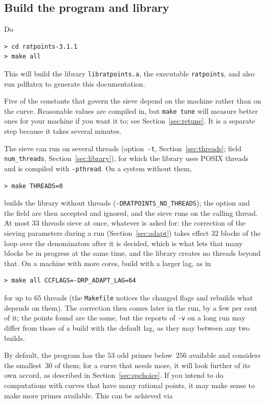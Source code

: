 \documentclass[12pt,a4paper,oneside]{amsart}
\begin{document}
\subsection{Build the program and library}\label{sec:build}

Do

\begin{verbatim}
> cd ratpoints-3.1.1
> make all
\end{verbatim}

This will build the library \texttt{libratpoints.a}, the executable
\texttt{ratpoints}, and also run pdf\/latex to generate this documentation.

Five of the constants that govern the sieve depend on the machine rather than
on the curve. Reasonable values are compiled in, but \texttt{make tune} will
measure better ones for your machine if you want it to; see
Section~\ref{sec:retune}. It is a separate step because it takes several
minutes.

The sieve can run on several threads (option~\verb+-t+,
Section~\ref{sec:threads}; field \texttt{num\_threads},
Section~\ref{sec:library}), for which the library uses POSIX threads and
is compiled with \verb+-pthread+. On a system without them,
\begin{verbatim}
> make THREADS=0
\end{verbatim}
builds the library without threads (\verb+-DRATPOINTS_NO_THREADS+); the
option and the field are then accepted and ignored, and the sieve runs on
the calling thread. At most $33$ threads sieve at once,
whatever is asked for: the correction of the sieving parameters during a
run (Section~\ref{sec:adapt}) takes effect $32$ blocks of the loop over
the denominators after it is decided, which is what lets that many blocks
be in progress at the same time, and the library creates no threads
beyond that. On a machine with more cores, build with a larger lag, as in
\begin{verbatim}
> make all CCFLAGS=-DRP_ADAPT_LAG=64
\end{verbatim}
for up to $65$ threads (the \texttt{Makefile} notices the changed flags
and rebuilds what depends on them). The correction then comes later in the run, by a
few per cent of it; the points found are the same, but the reports of
\verb+-v+ on a long run may differ from those of a build with the
default lag, as they may between any two builds.

By default, the program has the $53$ odd primes below~$256$ available and
considers the smallest~$30$ of them; for a curve that needs more, it will
look further of its own accord, as described in Section~\ref{sec:spchoice}.
If you intend to do computations with curves that have many rational points,
it may make sense to make more primes available. This can be achieved via
\end{document}
